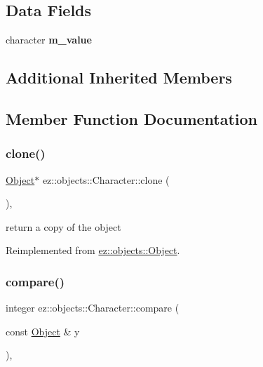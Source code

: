 \subsection*{Data Fields}
\begin{DoxyCompactItemize}
\item 
\mbox{\label{classez_1_1objects_1_1Character_aab5b89b7d8aac7509c9d23b4152cdb54}} 
character {\bfseries m\+\_\+value}
\end{DoxyCompactItemize}
\subsection*{Additional Inherited Members}


\subsection{Member Function Documentation}
\mbox{\label{classez_1_1objects_1_1Character_ad272c9b94a2d152f0832f2957cfd4e63}} 
\subsubsection{\texorpdfstring{clone()}{clone()}}
{\footnotesize\ttfamily \hyperlink{classez_1_1objects_1_1Object}{Object}$\ast$ ez\+::objects\+::\+Character\+::clone (\begin{DoxyParamCaption}{ }\end{DoxyParamCaption})\hspace{0.3cm}{\ttfamily [inline]}, {\ttfamily [virtual]}}

return a copy of the object 

Reimplemented from \hyperlink{classez_1_1objects_1_1Object_acf444b2581d898eb4b8c92c2d5865c9e}{ez\+::objects\+::\+Object}.

\mbox{\label{classez_1_1objects_1_1Character_a2e6241f13a2f749e7b1951667b4ec96a}} 
\subsubsection{\texorpdfstring{compare()}{compare()}}
{\footnotesize\ttfamily integer ez\+::objects\+::\+Character\+::compare (\begin{DoxyParamCaption}\item[{const \hyperlink{classez_1_1objects_1_1Object}{Object} \&}]{y }\end{DoxyParamCaption})\hspace{0.3cm}{\ttfamily [inline]}, {\ttfamily [virtual]}}

